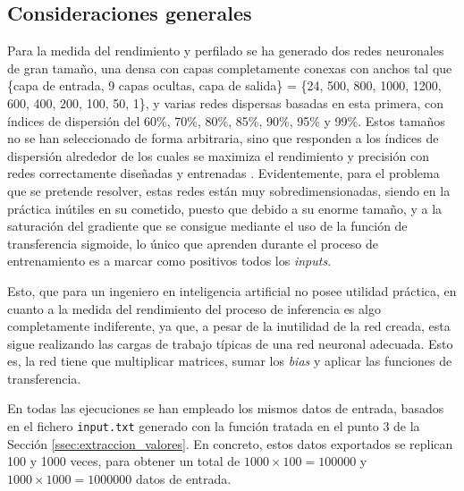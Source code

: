 \subsection{Consideraciones generales}
\label{ssec:consideraciones_generales}
Para la medida del rendimiento y perfilado se ha generado dos redes neuronales de gran tamaño, una densa con capas completamente conexas con anchos tal que \{capa de entrada, 9 capas ocultas, capa de salida\} = \{24, 500, 800, 1000, 1200, 600, 400, 200, 100, 50, 1\}, y varias redes dispersas basadas en esta primera, con índices de dispersión del 60\%, 70\%, 80\%, 85\%, 90\%, 95\% y 99\%. Estos tamaños no se han seleccionado de forma arbitraria, sino que responden a los índices de dispersión alrededor de los cuales se maximiza el rendimiento y precisión con redes correctamente diseñadas y entrenadas \cite[Figura 4]{hoefler2102sparsity}. Evidentemente, para el problema que se pretende resolver, estas redes están muy sobredimensionadas, siendo en la práctica inútiles en su cometido, puesto que debido a su enorme tamaño, y a la saturación del gradiente que se consigue mediante el uso de la función de transferencia sigmoide, lo único que aprenden durante el proceso de entrenamiento es a marcar como positivos todos los \textit{inputs}.

Esto, que para un ingeniero en inteligencia artificial no posee utilidad práctica, en cuanto a la medida del rendimiento del proceso de inferencia es algo completamente indiferente, ya que, a pesar de la inutilidad de la red creada, esta sigue realizando las cargas de trabajo típicas de una red neuronal adecuada. Esto es, la red tiene que multiplicar matrices, sumar los \textit{bias} y aplicar las funciones de transferencia.

En todas las ejecuciones se han empleado los mismos datos de entrada, basados en el fichero \texttt{input.txt} generado con la función tratada en el punto 3 de la Sección \ref{ssec:extraccion_valores}. En concreto, estos datos exportados se replican 100 y 1000 veces, para obtener un total de $1000 \times 100 = 100000$ y $1000 \times 1000 = 1000000$ datos de entrada.


